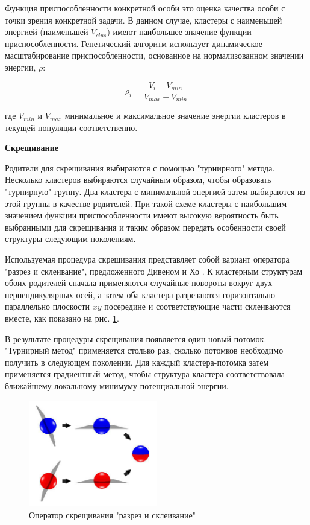Функция приспособленности конкретной особи это оценка качества особи с точки зрения
конкретной задачи. В данном случае, кластеры с наименьшей энергией (наименьшей $V_{clus}$)
имеют наибольшее значение функции приспособленности. Генетический алгоритм использует
динамическое масштабирование приспособленности, основанное на нормализованном значении
энергии, $\rho$:

\begin{equation}
  \rho_{i} = \frac{V_{i} - V_{min}}{V_{max}-V_{min}}
\end{equation}

где $V_{min}$ и $V_{max}$ минимальное и максимальное значение энергии кластеров в
текущей популяции соответственно.

{\bf Скрещивание}

Родители для скрещивания выбираются с помощью "турнирного" метода. Несколько кластеров
выбираются случайным образом, чтобы образовать "турнирную" группу. Два кластера с минимальной
энергией затем выбираются из этой группы в качестве родителей. При такой схеме кластеры
с наибольшим значением функции приспособленности имеют высокую вероятность быть выбранными
для скрещивания и таким образом передать особенности своей структуры следующим поколениям.

Используемая процедура скрещивания представляет собой вариант оператора "разрез и склеивание",
предложенного Дивеном и Хо \cite{Deaven1995}. К кластерным структурам обоих родителей сначала
применяются случайные повороты вокруг двух перпендикулярных осей, а затем оба кластера разрезаются
горизонтально параллельно плоскости $xy$ посередине и соответствующие части склеиваются вместе,
как показано на рис. \ref{cut_and_splice}.

В результате процедуры скрещивания появляется один новый потомок. "Турнирный метод" применяется
столько раз, сколько потомков необходимо получить в следующем поколении.
Для каждый кластера-потомка затем применяется градиентный метод, чтобы структура кластера
соответствовала ближайшему локальному минимуму потенциальной энергии.

\begin{figure}[h!]
\centering
  \includegraphics[width=0.5\textwidth]{./FIGs/cut_and_splice.png}
\caption{Оператор скрещивания "разрез и склеивание"}
\label{cut_and_splice}
\end{figure}

